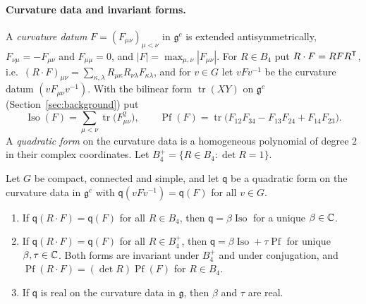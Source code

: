 \paragraph{Curvature data and invariant forms.} A \emph{curvature datum} $F=(F_{\mu\nu})_{\mu<\nu}$ in $\mathfrak g^c$ is extended antisymmetrically, $F_{\nu\mu}=-F_{\mu\nu}$ and $F_{\mu\mu}=0$, and $|F|=\max_{\mu,\nu}|F_{\mu\nu}|$. For $R\in B_4$ put $R\cdot F=RFR^{\sf T}$, i.e.\ $(R\cdot F)_{\mu\nu}=\sum_{\kappa,\lambda}R_{\mu\kappa}R_{\nu\lambda}F_{\kappa\lambda}$, and for $v\in G$ let $vFv^{-1}$ be the curvature datum $(vF_{\mu\nu}v^{-1})$. With the bilinear form $\operatorname{tr}(XY)$ on $\mathfrak g^c$ (Section~\ref{sec:background}) put
\[
\operatorname{Iso}(F)=\sum_{\mu<\nu}\operatorname{tr}\big(F_{\mu\nu}^2\big),\qquad\operatorname{Pf}(F)=\operatorname{tr}\big(F_{12}F_{34}-F_{13}F_{24}+F_{14}F_{23}\big).
\]
A \emph{quadratic form} on the curvature data is a homogeneous polynomial of degree $2$ in their complex coordinates. Let $B_4^+=\{R\in B_4:\det R=1\}$.

\begin{lemma}\label{lem:b4-forms}
Let $G$ be compact, connected and simple, and let $\mathsf q$ be a quadratic form on the curvature data in $\mathfrak g^c$ with $\mathsf q(vFv^{-1})=\mathsf q(F)$ for all $v\in G$.
\begin{enumerate}[label=(\alph*)]
\item If $\mathsf q(R\cdot F)=\mathsf q(F)$ for all $R\in B_4$, then $\mathsf q=\beta\operatorname{Iso}$ for a unique $\beta\in\mathbb C$.
\item If $\mathsf q(R\cdot F)=\mathsf q(F)$ for all $R\in B_4^+$, then $\mathsf q=\beta\operatorname{Iso}+\tau\operatorname{Pf}$ for unique $\beta,\tau\in\mathbb C$. Both forms are invariant under $B_4^+$ and under conjugation, and $\operatorname{Pf}(R\cdot F)=(\det R)\operatorname{Pf}(F)$ for $R\in B_4$.
\item If $\mathsf q$ is real on the curvature data in $\mathfrak g$, then $\beta$ and $\tau$ are real.
\end{enumerate}
\end{lemma}

